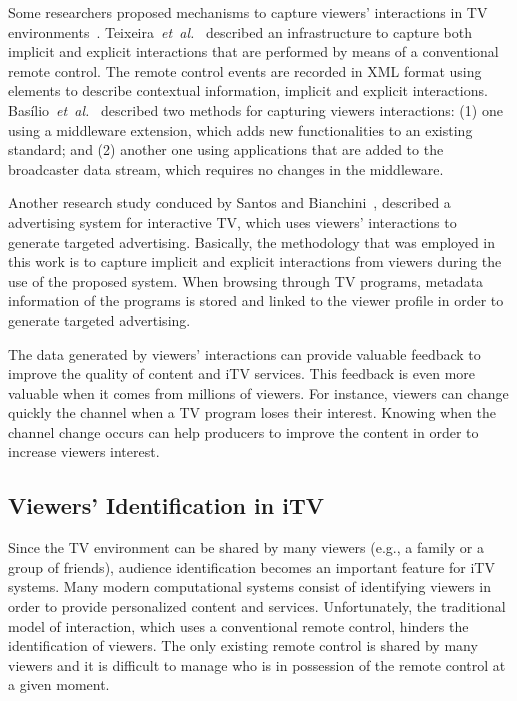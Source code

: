 \documentclass[journal]{IEEEtran}
\begin{document}
Some researchers proposed mechanisms to capture viewers' interactions in TV environments~\cite{Teixeira2010,Basilio2013,DosSantos2013}. Teixeira~\emph{et~al.}~\cite{Teixeira2010} described an infrastructure to capture both implicit and explicit interactions that are performed by means of a conventional remote control. The remote control events are recorded in XML format using elements to describe contextual information, implicit and explicit interactions. Bas\'{i}lio~\emph{et~al.}~\cite{Basilio2013} described two methods for capturing viewers interactions: (1) one using a middleware extension, which adds new functionalities to an existing standard; and (2) another one using applications that are added to the broadcaster data stream, which requires no changes in the middleware.

Another research study conduced by Santos and Bianchini~\cite{DosSantos2013}, described a advertising system for interactive TV, which uses viewers' interactions to generate targeted advertising. Basically, the methodology that was employed in this work is to capture implicit and explicit interactions from viewers during the use of the proposed system. When browsing through TV programs, metadata information of the programs is stored and linked to the viewer profile in order to generate targeted advertising.

The data generated by viewers' interactions can provide valuable feedback to improve the quality of content and iTV services. This feedback is even more valuable when it comes from millions of viewers. For instance, viewers can change quickly the channel when a TV program loses their interest. Knowing when the channel change occurs can help producers to improve the content in order to increase viewers interest.

\subsection{Viewers' Identification in iTV}
\label{ssec_ident_viewers_itv}

Since the TV environment can be shared by many viewers (e.g., a family or a group of friends), audience identification becomes an important feature for iTV systems. Many modern computational systems consist of identifying viewers in order to provide personalized content and services. Unfortunately, the traditional model of interaction, which uses a conventional remote control, hinders the identification of viewers. The only existing remote control is shared by many viewers and it is difficult to manage who is in possession of the remote control at a given moment.
\end{document}
